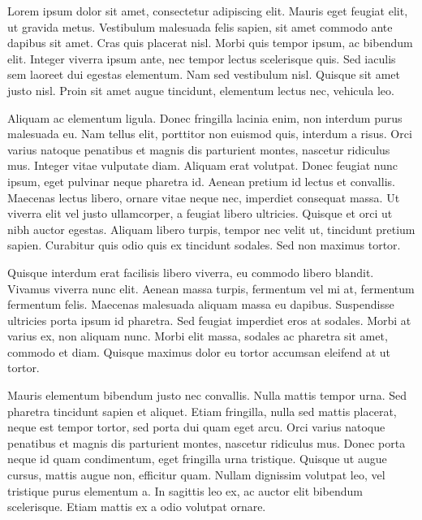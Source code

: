 {\fontsize{10}{10}\selectfont
Lorem ipsum dolor sit amet, consectetur adipiscing elit. Mauris eget feugiat elit, ut gravida metus. 
Vestibulum malesuada felis sapien, sit amet commodo ante dapibus sit amet.
Cras quis placerat nisl. Morbi quis tempor ipsum, ac bibendum elit. 
Integer viverra ipsum ante, nec tempor lectus scelerisque quis. 
Sed iaculis sem laoreet dui egestas elementum. Nam sed vestibulum nisl. 
Quisque sit amet justo nisl. Proin sit amet augue tincidunt, elementum lectus nec, vehicula leo.

Aliquam ac elementum ligula. Donec fringilla lacinia enim, non interdum purus malesuada eu. 
Nam tellus elit, porttitor non euismod quis, interdum a risus. 
Orci varius natoque penatibus et magnis dis parturient montes, nascetur ridiculus mus. Integer vitae vulputate diam. 
Aliquam erat volutpat. Donec feugiat nunc ipsum, eget pulvinar neque pharetra id. Aenean pretium id lectus et convallis. 
Maecenas lectus libero, ornare vitae neque nec, imperdiet consequat massa. 
Ut viverra elit vel justo ullamcorper, a feugiat libero ultricies. Quisque et orci ut nibh auctor egestas. 
Aliquam libero turpis, tempor nec velit ut, tincidunt pretium sapien. 
Curabitur quis odio quis ex tincidunt sodales. Sed non maximus tortor.

Quisque interdum erat facilisis libero viverra, eu commodo libero blandit. 
Vivamus viverra nunc elit. Aenean massa turpis, fermentum vel mi at, fermentum fermentum felis. 
Maecenas malesuada aliquam massa eu dapibus. Suspendisse ultricies porta ipsum id pharetra. 
Sed feugiat imperdiet eros at sodales. Morbi at varius ex, non aliquam nunc. 
Morbi elit massa, sodales ac pharetra sit amet, commodo et diam. 
Quisque maximus dolor eu tortor accumsan eleifend at ut tortor.

Mauris elementum bibendum justo nec convallis. Nulla mattis tempor urna. Sed pharetra tincidunt sapien et aliquet. 
Etiam fringilla, nulla sed mattis placerat, neque est tempor tortor, sed porta dui quam eget arcu. 
Orci varius natoque penatibus et magnis dis parturient montes, nascetur ridiculus mus. 
Donec porta neque id quam condimentum, eget fringilla urna tristique. Quisque ut augue cursus, mattis augue non, efficitur quam. 
Nullam dignissim volutpat leo, vel tristique purus elementum a. 
In sagittis leo ex, ac auctor elit bibendum scelerisque. Etiam mattis ex a odio volutpat ornare.

}
